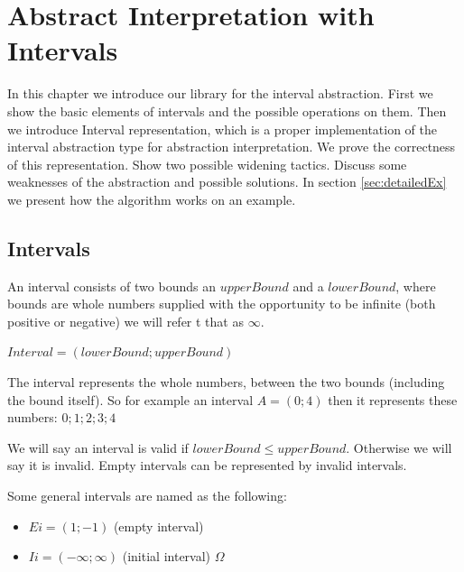 
\chapter{Abstract Interpretation with Intervals}
\label{sec:intervalabstraction}

In this chapter we introduce our library for the interval abstraction. First we show the basic elements of intervals and the possible operations on them. Then we introduce Interval representation, which is a proper implementation of the interval abstraction type for abstraction interpretation. We prove the correctness of this representation. Show two possible widening tactics. Discuss some weaknesses of the abstraction and possible solutions. In section \ref{sec:detailedEx} we present how the algorithm works on an example.

\section{Intervals}

An interval consists of two bounds an $upperBound$ and a $lowerBound$, where bounds are whole numbers supplied with the opportunity to be infinite (both positive or negative) we will refer t that as $\infty$.

$Interval=(lowerBound;upperBound)$

The interval represents the whole numbers, between the two bounds (including the bound itself).
So for example an interval $A=(0;4)$ then it represents these numbers: ${0;1;2;3;4}$

We will say an interval is valid if $lowerBound \leq upperBound$. Otherwise we will say it is invalid. Empty intervals can be represented by invalid intervals.

Some general intervals are named as the following:

\begin{itemize}
\item $Ei=(1;-1)$ (empty interval)
\end{itemize}

\begin{itemize}
\item $Ii=(-\infty;\infty)$ (initial interval) $\Omega$
\end{itemize}

